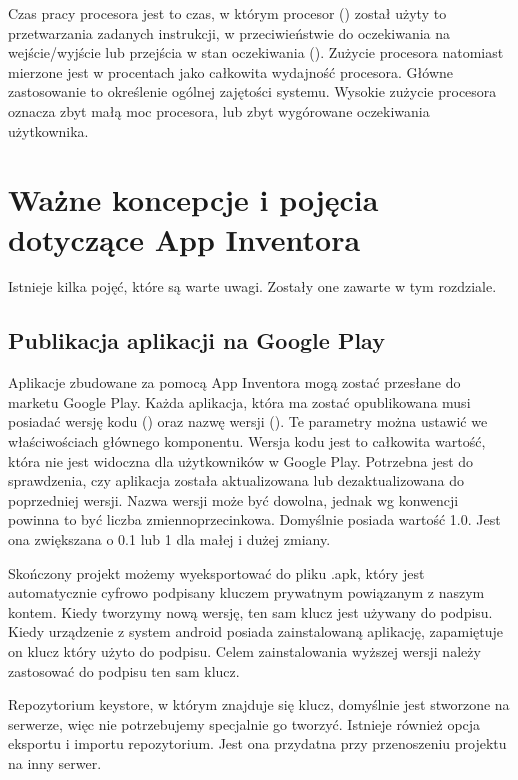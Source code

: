 Czas pracy procesora jest to czas, w którym procesor () został użyty to przetwarzania zadanych instrukcji, w przeciwieństwie do oczekiwania na wejście/wyjście lub przejścia w stan oczekiwania (). Zużycie procesora natomiast mierzone jest w procentach jako całkowita wydajność procesora. Główne zastosowanie to określenie ogólnej zajętości systemu. Wysokie zużycie procesora oznacza zbyt małą moc procesora, lub zbyt wygórowane oczekiwania użytkownika.


\section{Ważne koncepcje i pojęcia dotyczące App Inventora}

Istnieje kilka pojęć, które są warte uwagi. Zostały one zawarte w tym rozdziale.

\subsection{Publikacja aplikacji na Google Play}

Aplikacje zbudowane za pomocą App Inventora mogą zostać przesłane do marketu Google Play. Każda aplikacja, która ma zostać opublikowana musi posiadać wersję kodu () oraz nazwę wersji (). Te parametry można ustawić we właściwościach głównego komponentu\cite{doc:concepts}. Wersja kodu jest to całkowita wartość, która nie jest widoczna dla użytkowników w Google Play. Potrzebna jest do sprawdzenia, czy aplikacja została aktualizowana lub dezaktualizowana do poprzedniej wersji. Nazwa wersji może być dowolna, jednak wg konwencji powinna to być liczba zmiennoprzecinkowa. Domyślnie posiada wartość 1.0. Jest ona zwiększana o 0.1 lub 1 dla małej i dużej zmiany.

Skończony projekt możemy wyeksportować do pliku .apk, który jest automatycznie cyfrowo podpisany kluczem prywatnym powiązanym z naszym kontem. Kiedy tworzymy nową wersję, ten sam klucz jest używany do podpisu. Kiedy urządzenie z system android posiada zainstalowaną aplikację, zapamiętuje on klucz który użyto do podpisu. Celem zainstalowania wyższej wersji należy zastosować do podpisu ten sam klucz. 

Repozytorium keystore, w którym znajduje się klucz, domyślnie jest stworzone na serwerze, więc nie potrzebujemy specjalnie go tworzyć. Istnieje również opcja eksportu i importu repozytorium. Jest ona przydatna przy przenoszeniu projektu na inny serwer.

